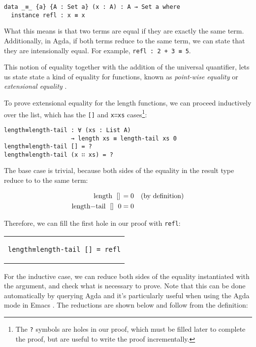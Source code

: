 \documentclass[runningheads]{llncs}
\begin{document}
\begin{lstlisting}
data _≡_ {a} {A : Set a} (x : A) : A → Set a where
  instance refl : x ≡ x
\end{lstlisting}

What this means is that two terms are equal if they are exactly the same term.
Additionally, in Agda, if both terms reduce to the same term, we can state that they are
intensionally equal. For example, \lstinline{refl : 2 + 3 ≡
5}.

This notion of equality together with the addition of the universal quantifier, lets us
state state a kind of equality for functions, known as \emph{point-wise equality} or
\emph{extensional equality} \cite{botta2021extensional}.

To prove extensional equality for the length functions, we can proceed inductively over
the list, which has the \lstinline{[]} and \lstinline{x∷xs} cases\footnote{The \lstinline{?} symbols
are holes in our proof, which must be filled later to complete the proof, but are useful
to write the proof incrementally.}:

\begin{lstlisting}
length≡length-tail : ∀ (xs : List A)
                   → length xs ≡ length-tail xs 0
length≡length-tail [] = ?
length≡length-tail (x ∷ xs) = ?
\end{lstlisting}

The base case is trivial, because both sides of the equality in the result type reduce to
to the same term:

\begin{align*}
  \lstinline{length []} &= \lstinline{0} & \text{(by definition)} \\
  \lstinline{length-tail [] 0} &= \lstinline{0} \\
\end{align*}

Therefore, we can fill the first hole in our proof with \lstinline{refl}:

\begin{center}
\begin{tabular}{c}
\begin{lstlisting}
length≡length-tail [] = refl
\end{lstlisting}
\end{tabular}
\end{center}

For the inductive case, we can reduce both sides of the equality instantiated with the
argument, and check what is necessary to prove. Note that this can be done automatically
by querying Agda and it's particularly useful when using the Agda mode in Emacs
\cite{wadler2018programming}. The reductions are shown below and follow from the
definition:
\end{document}
